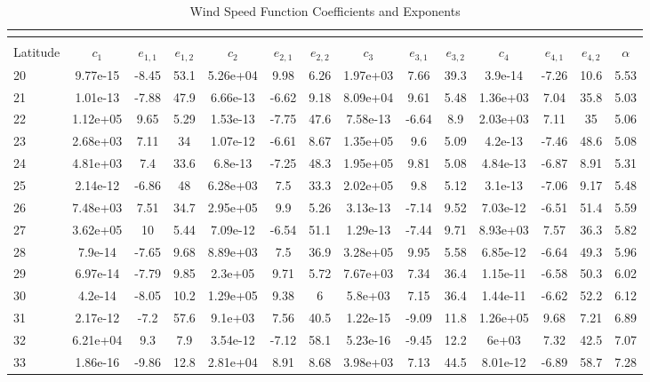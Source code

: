 \documentclass[]{aiaa-tc}%
\begin{document}
\tiny
\begin{longtable}{lccccccccccccc} \\
\label{t:windvals} \\
    \toprule
    \toprule
    \caption{Wind Speed Function Coefficients and Exponents} \\
    Latitude & $c_1$ & $e_{1,1}$ & $e_{1,2}$ & $c_2$ & $e_{2,1}$ & $e_{2,2}$ & $c_3$ & $e_{3,1}$ & $e_{3,2}$ & $c_4$ & $e_{4,1}$ & $e_{4,2}$ & $\alpha$ \\
    \midrule
20 & 9.77e-15 & -8.45 & 53.1 & 5.26e+04 & 9.98 & 6.26 & 1.97e+03 & 7.66 & 39.3 & 3.9e-14 & -7.26 & 10.6 & 5.53\\
21 & 1.01e-13 & -7.88 & 47.9 & 6.66e-13 & -6.62 & 9.18 & 8.09e+04 & 9.61 & 5.48 & 1.36e+03 & 7.04 & 35.8 & 5.03\\
22 & 1.12e+05 & 9.65 & 5.29 & 1.53e-13 & -7.75 & 47.6 & 7.58e-13 & -6.64 & 8.9 & 2.03e+03 & 7.11 & 35 & 5.06\\
23 & 2.68e+03 & 7.11 & 34 & 1.07e-12 & -6.61 & 8.67 & 1.35e+05 & 9.6 & 5.09 & 4.2e-13 & -7.46 & 48.6 & 5.08\\
24 & 4.81e+03 & 7.4 & 33.6 & 6.8e-13 & -7.25 & 48.3 & 1.95e+05 & 9.81 & 5.08 & 4.84e-13 & -6.87 & 8.91 & 5.31\\
25 & 2.14e-12 & -6.86 & 48 & 6.28e+03 & 7.5 & 33.3 & 2.02e+05 & 9.8 & 5.12 & 3.1e-13 & -7.06 & 9.17 & 5.48\\
26 & 7.48e+03 & 7.51 & 34.7 & 2.95e+05 & 9.9 & 5.26 & 3.13e-13 & -7.14 & 9.52 & 7.03e-12 & -6.51 & 51.4 & 5.59\\
27 & 3.62e+05 & 10 & 5.44 & 7.09e-12 & -6.54 & 51.1 & 1.29e-13 & -7.44 & 9.71 & 8.93e+03 & 7.57 & 36.3 & 5.82\\
28 & 7.9e-14 & -7.65 & 9.68 & 8.89e+03 & 7.5 & 36.9 & 3.28e+05 & 9.95 & 5.58 & 6.85e-12 & -6.64 & 49.3 & 5.96\\
29 & 6.97e-14 & -7.79 & 9.85 & 2.3e+05 & 9.71 & 5.72 & 7.67e+03 & 7.34 & 36.4 & 1.15e-11 & -6.58 & 50.3 & 6.02\\
30 & 4.2e-14 & -8.05 & 10.2 & 1.29e+05 & 9.38 & 6 & 5.8e+03 & 7.15 & 36.4 & 1.44e-11 & -6.62 & 52.2 & 6.12\\
31 & 2.17e-12 & -7.2 & 57.6 & 9.1e+03 & 7.56 & 40.5 & 1.22e-15 & -9.09 & 11.8 & 1.26e+05 & 9.68 & 7.21 & 6.89\\
32 & 6.21e+04 & 9.3 & 7.9 & 3.54e-12 & -7.12 & 58.1 & 5.23e-16 & -9.45 & 12.2 & 6e+03 & 7.32 & 42.5 & 7.07\\
33 & 1.86e-16 & -9.86 & 12.8 & 2.81e+04 & 8.91 & 8.68 & 3.98e+03 & 7.13 & 44.5 & 8.01e-12 & -6.89 & 58.7 & 7.28\\

\end{longtable}
\end{document}
